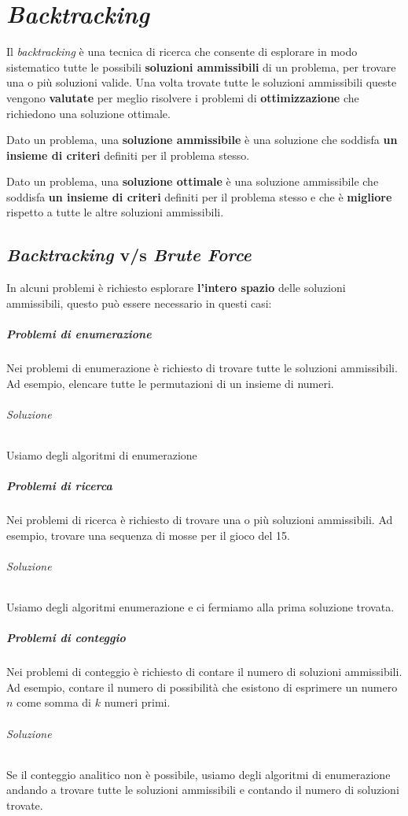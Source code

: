\chapter{\textit{Backtracking}}
\thispagestyle{chapterInit}

Il \textit{backtracking} è una tecnica di ricerca che consente di esplorare in modo sistematico tutte le possibili \textbf{soluzioni ammissibili} di un problema, per trovare una o più soluzioni valide. Una volta trovate tutte le soluzioni ammissibili queste vengono \textbf{valutate} per meglio risolvere i problemi di \textbf{ottimizzazione} che richiedono una soluzione ottimale. 
\begin{definition}
    Dato un problema, una \textbf{soluzione ammissibile} è una soluzione che soddisfa \textbf{un insieme di criteri} definiti per il problema stesso.
\end{definition}
\begin{definition}
    Dato un problema, una \textbf{soluzione ottimale} è una soluzione ammissibile che soddisfa \textbf{un insieme di criteri} definiti per il problema stesso e che è \textbf{migliore} rispetto a tutte le altre soluzioni ammissibili.
\end{definition}
\section{\textit{Backtracking} v/s \textit{Brute Force}}
    In alcuni problemi è richiesto esplorare \textbf{l'intero spazio} delle soluzioni ammissibili, questo può essere necessario in questi casi:
    \paragraph{Problemi di enumerazione} Nei problemi di enumerazione è richiesto di trovare tutte le soluzioni ammissibili. Ad esempio, elencare tutte le permutazioni di un insieme di numeri. 
        \subparagraph{Soluzione} Usiamo degli algoritmi di enumerazione
    \paragraph{Problemi di ricerca} Nei problemi di ricerca è richiesto di trovare una o più soluzioni ammissibili. Ad esempio, trovare una sequenza di mosse per il gioco del 15. 
        \subparagraph{Soluzione} Usiamo degli algoritmi enumerazione e ci fermiamo alla prima soluzione trovata.
    \paragraph{Problemi di conteggio} Nei problemi di conteggio è richiesto di contare il numero di soluzioni ammissibili. Ad esempio, contare il numero di possibilità che esistono di esprimere un numero $n$ come somma di $k$ numeri primi.
        \subparagraph{Soluzione} Se il conteggio analitico non è possibile, usiamo degli algoritmi di enumerazione andando a trovare tutte le soluzioni ammissibili e contando il numero di soluzioni trovate.
